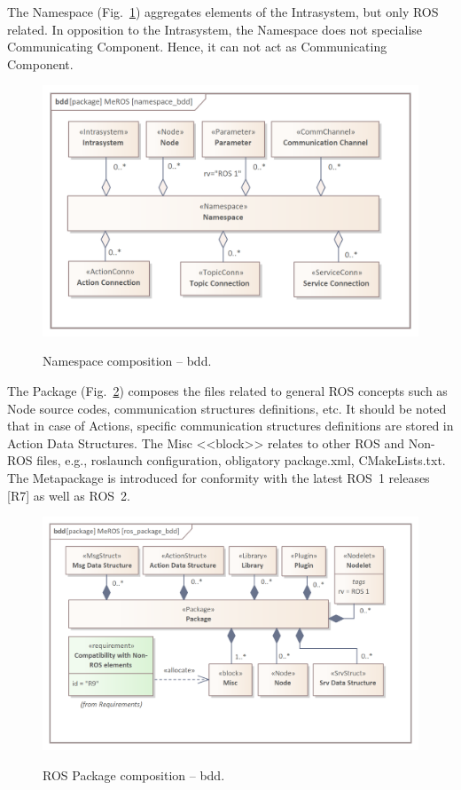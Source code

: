 \documentclass[11pt,oneside,a4paper]{article}
\begin{document}
	\pagebreak
	
	The Namespace (Fig.~\ref{fig:namespace_bdd}) aggregates elements of the Intrasystem, but only ROS related. In opposition to the Intrasystem, the Namespace does not specialise Communicating Component. Hence, it can not act as Communicating Component.
	
	
	\begin{figure}[H]
		\centering
		\begin{center}
			{\includegraphics[scale=1.0]{img/meros_pkg/namespace_bdd.png}}
		\end{center}
		\caption{Namespace composition -- bdd.} 
		\label{fig:namespace_bdd}
	\end{figure}
	
	
	The Package (Fig.~\ref{fig:ros_package_bdd}) composes the files related to general ROS concepts such as Node source codes, communication structures definitions, etc. It should be noted that in case of Actions, specific communication structures definitions are stored in Action Data Structures. The Misc <<block>> relates to other ROS and Non-ROS files, e.g., roslaunch configuration, obligatory package.xml, CMakeLists.txt. The Metapackage is introduced for conformity with the latest ROS~1 releases [R7] as well as ROS~2. 
	
	
	\begin{figure}[H]
		\centering
		\begin{center}
			{\includegraphics[scale=1.0]{img/meros_pkg/ros_package_bdd.png}}
		\end{center}
		\caption{ROS Package composition -- bdd.} 
		\label{fig:ros_package_bdd}
	\end{figure}
		
\end{document}
